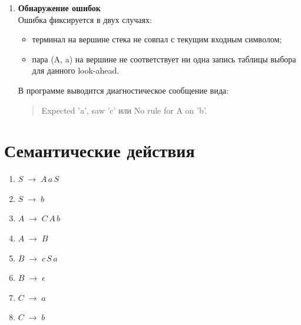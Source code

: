 \documentclass[areasetadvanced]{scrartcl}
\begin{document}
\begin{enumerate}
  \item \textbf{Обнаружение ошибок}\\
  Ошибка фиксируется в двух случаях:
  \begin{itemize}
    \item терминал на вершине стека не совпал с текущим входным символом;
    \item пара (A, a) на вершине не соответствует ни одна запись таблицы выбора для данного look-ahead.
  \end{itemize}
  В программе выводится диагностическое сообщение вида:
  \begin{quote}
    Expected 'a', saw 'c' или No rule for A on 'b'.
  \end{quote}
\end{enumerate}

\newpage
\section{Семантические действия}
\begin{enumerate}
    \item $S  \;\rightarrow\; A\,a\,S$           
    \item $S  \;\rightarrow\; b$             
    \item $A  \;\rightarrow\; C\,A\,b$          
    \item $A  \;\rightarrow\; B$              
    \item $B  \;\rightarrow\; c\,S\,a$         
    \item $B \;\rightarrow\;  \epsilon $          
    \item $C  \;\rightarrow\; a$                 
    \item $C  \;\rightarrow\; b$                
  \end{enumerate}
  
\end{document}
